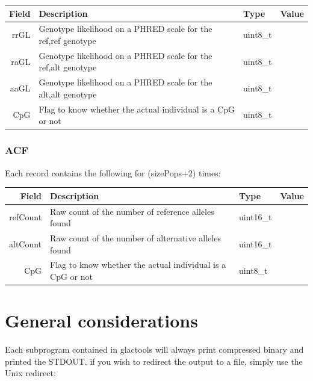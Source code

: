 \documentclass[a4paper]{article}
\begin{document}
\noindent \begin{tabular}{|r|p{6cm}|l|l|}
\hline
{\bf Field} & {\bf Description} & {\bf Type} & {\bf Value} \\
\hline
rrGL & Genotype likelihood on a PHRED scale for the ref,ref genotype & uint8\_t &  \\
\hline
raGL & Genotype likelihood on a PHRED scale for the ref,alt genotype & uint8\_t &  \\
\hline
aaGL & Genotype likelihood on a PHRED scale for the alt,alt genotype & uint8\_t &  \\
\hline
CpG & Flag to know whether the actual individual is a CpG or not & uint8\_t &  \\
\hline
\end{tabular}


\clearpage



\subsubsection{ACF}

\noindent Each record contains the following for (sizePops+2) times:

\noindent \begin{tabular}{|r|p{6cm}|l|l|}
\hline
{\bf Field} & {\bf Description} & {\bf Type} & {\bf Value} \\
\hline
refCount & Raw count of the number of reference alleles found & uint16\_t &  \\
\hline
altCount & Raw count of the number of alternative alleles found & uint16\_t &  \\
\hline
CpG & Flag to know whether the actual individual is a CpG or not & uint8\_t &  \\
\hline
\end{tabular}




\newpage
\section{General considerations}

Each subprogram contained in glactools will always print compressed binary and printed the STDOUT.  if you wish to redirect the output to a file, simply use the Unix redirect:
\end{document}
